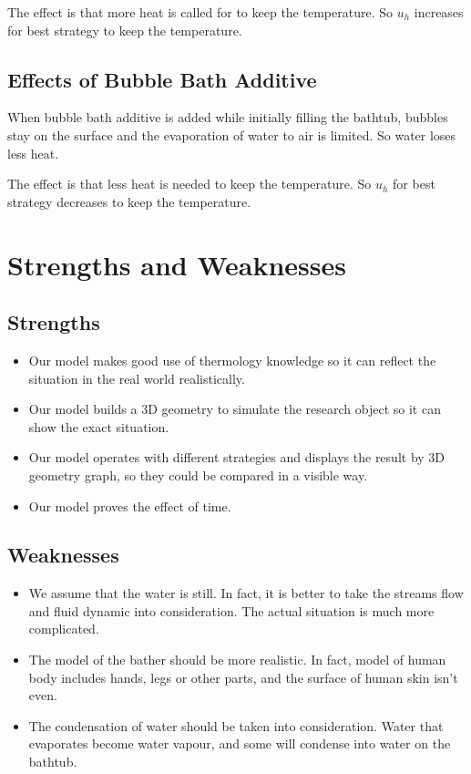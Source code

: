 \documentclass[12pt,a4paper,titlepage]{article}
\begin{document}
The effect is that more heat is called for to keep the temperature. So $u_h$ increases for best strategy to keep the temperature.


\subsection{Effects of Bubble Bath Additive}
\label{sec:effects of bubble bath additive}
When bubble bath additive is added while initially filling the bathtub, bubbles stay on the surface and the evaporation of water to air is limited. So water loses less heat.

The effect is that less heat is needed to keep the temperature. So $u_h$ for best strategy decreases to keep the temperature.

\section{Strengths and Weaknesses}
\label{sec:strengths-and-weaknesses}

\subsection*{Strengths}
\label{sec:strengths}

\begin{itemize}
\item Our model makes good use of thermology knowledge so it can reflect the situation in the real world realistically.
\item Our model builds a 3D geometry to simulate the research object so it can show the exact situation.
\item Our model operates with different strategies and displays the result by 3D geometry graph, so they could be compared in a visible way.
\item Our model proves the effect of time.
\end{itemize}

\subsection*{Weaknesses}
\label{sec:weaknesses}

\begin{itemize}
\item We assume that the water is still. In fact, it is better to take the streams flow and fluid dynamic into consideration. The actual situation is much more complicated.
\item The model of the bather should be more realistic. In fact, model of human body includes hands, legs or other parts, and the surface of human skin isn't even.
\item The condensation of water should be taken into consideration. Water that evaporates become water vapour, and some will condense into water on the bathtub.
\end{itemize}
\end{document}

